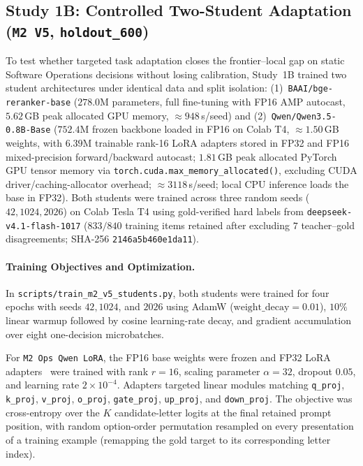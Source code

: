 \documentclass[11pt,a4paper]{article}
\begin{document}
\subsection{Study 1B: Controlled Two-Student Adaptation (\texttt{M2 V5}, \texttt{holdout\_600})}

To test whether targeted task adaptation closes the frontier--local gap on static Software Operations decisions without losing calibration, Study~1B trained two student architectures under identical data and split isolation: (1)~\texttt{BAAI/bge-reranker-base} ($278.0$M parameters, full fine-tuning with FP16 AMP autocast, $5.62$\,GB peak allocated GPU memory, $\approx 948$\,s/seed) and (2)~\texttt{Qwen/Qwen3.5-0.8B-Base} ($752.4$M frozen backbone loaded in FP16 on Colab T4, $\approx 1.50$\,GB weights, with $6.39$M trainable rank-16 LoRA adapters stored in FP32 and FP16 mixed-precision forward/backward autocast; $1.81$\,GB peak allocated PyTorch GPU tensor memory via \texttt{torch.cuda.max\_memory\_allocated()}, excluding CUDA driver/caching-allocator overhead; $\approx 3118$\,s/seed; local CPU inference loads the base in FP32). Both students were trained across three random seeds ($42, 1024, 2026$) on Colab Tesla T4 using gold-verified hard labels from \texttt{deepseek-v4.1-flash-1017} ($833/840$ training items retained after excluding $7$ teacher--gold disagreements; SHA-256 \texttt{2146a5b460e1da11}).

\paragraph{Training Objectives and Optimization.}
In \texttt{scripts/train\_m2\_v5\_students.py}, both students were trained for four epochs with seeds $42, 1024$, and $2026$ using AdamW ($\text{weight\_decay}=0.01$), $10\%$ linear warmup followed by cosine learning-rate decay, and gradient accumulation over eight one-decision microbatches.

For \texttt{M2 Ops Qwen LoRA}, the FP16 base weights were frozen and FP32 LoRA adapters~\cite{hu2022lora} were trained with rank $r=16$, scaling parameter $\alpha=32$, dropout $0.05$, and learning rate $2\times 10^{-4}$. Adapters targeted linear modules matching \texttt{q\_proj}, \texttt{k\_proj}, \texttt{v\_proj}, \texttt{o\_proj}, \texttt{gate\_proj}, \texttt{up\_proj}, and \texttt{down\_proj}. The objective was cross-entropy over the $K$ candidate-letter logits at the final retained prompt position, with random option-order permutation resampled on every presentation of a training example (remapping the gold target to its corresponding letter index).
\end{document}

